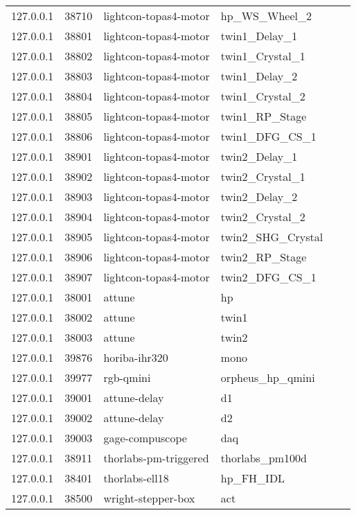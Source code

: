 \begin{table}[]
\begin{tabular}{llllll}
127.0.0.1 & 38710 & lightcon-topas4-motor   & hp\_WS\_Wheel\_2   \\
127.0.0.1 & 38801 & lightcon-topas4-motor   & twin1\_Delay\_1    \\
127.0.0.1 & 38802 & lightcon-topas4-motor   & twin1\_Crystal\_1  \\
127.0.0.1 & 38803 & lightcon-topas4-motor   & twin1\_Delay\_2    \\
127.0.0.1 & 38804 & lightcon-topas4-motor   & twin1\_Crystal\_2  \\
127.0.0.1 & 38805 & lightcon-topas4-motor   & twin1\_RP\_Stage   \\
127.0.0.1 & 38806 & lightcon-topas4-motor   & twin1\_DFG\_CS\_1  \\
127.0.0.1 & 38901 & lightcon-topas4-motor   & twin2\_Delay\_1    \\
127.0.0.1 & 38902 & lightcon-topas4-motor   & twin2\_Crystal\_1  \\
127.0.0.1 & 38903 & lightcon-topas4-motor   & twin2\_Delay\_2    \\
127.0.0.1 & 38904 & lightcon-topas4-motor   & twin2\_Crystal\_2  \\
127.0.0.1 & 38905 & lightcon-topas4-motor   & twin2\_SHG\_Crystal \\
127.0.0.1 & 38906 & lightcon-topas4-motor   & twin2\_RP\_Stage   \\
127.0.0.1 & 38907 & lightcon-topas4-motor   & twin2\_DFG\_CS\_1  \\
127.0.0.1 & 38001 & attune                  & hp                 \\
127.0.0.1 & 38002 & attune                  & twin1              \\
127.0.0.1 & 38003 & attune                  & twin2              \\
127.0.0.1 & 39876 & horiba-ihr320           & mono               \\
127.0.0.1 & 39977 & rgb-qmini               & orpheus\_hp\_qmini \\
127.0.0.1 & 39001 & attune-delay            & d1                 \\
127.0.0.1 & 39002 & attune-delay            & d2                 \\
127.0.0.1 & 39003 & gage-compuscope         & daq                \\
127.0.0.1 & 38911 & thorlabs-pm-triggered   & thorlabs\_pm100d   \\
127.0.0.1 & 38401 & thorlabs-ell18          & hp\_FH\_IDL        \\
127.0.0.1 & 38500 & wright-stepper-box      & act                \\

\end{tabular}
\end{table}
